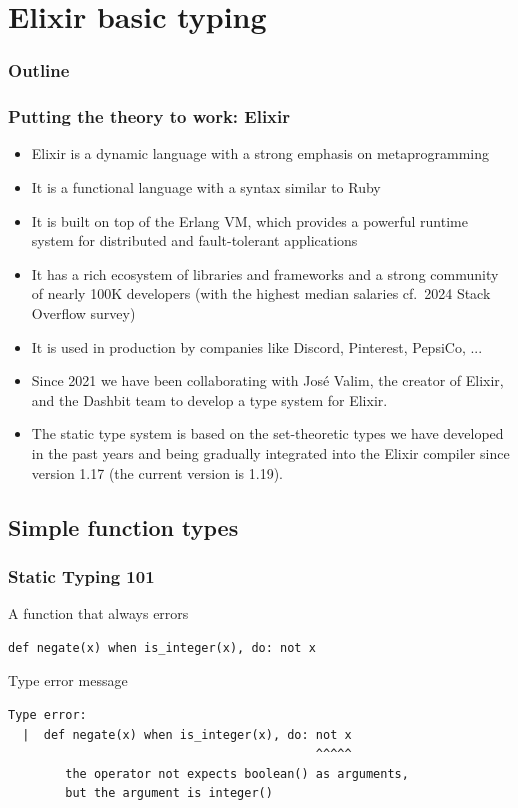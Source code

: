 
\section{Elixir basic typing}

\begin{frame}
\frametitle{Outline} 
\tableofcontents[currentsection]
\end{frame}

\begin{frame}
\frametitle{Putting the theory to work: Elixir}
\begin{itemize}
\item<1-> Elixir is a dynamic language with a strong emphasis on metaprogramming
\item<2-> It is a functional language with a syntax similar to Ruby
\item<3-> It is built on top of the Erlang VM, which provides a powerful runtime system for distributed and fault-tolerant applications
\item<4-> It has a rich ecosystem of libraries and frameworks and a strong community of nearly 100K developers (with the highest median salaries cf.\  2024 Stack Overflow survey)
\item<5-> It is used in production by companies like Discord, Pinterest, PepsiCo, ...
\item<6-> Since 2021 we have been collaborating with José Valim, the creator of Elixir, and the Dashbit team to develop a type system for Elixir.
\item<7-> The static type system is based on the set-theoretic types we have developed in the past years and being gradually integrated into the Elixir compiler since version 1.17 (the current version is 1.19).
\end{itemize}
\end{frame}


\subsection{Simple function types}


\begin{frame}[fragile]
\frametitle{Static Typing 101}
\begin{block}{A function that always errors}
\begin{verbatim}
def negate(x) when is_integer(x), do: not x
\end{verbatim}
\end{block}\pause
\begin{block}{Type error message}
\begin{verbatim}
Type error:
  |  def negate(x) when is_integer(x), do: not x
                                           ^^^^^
        the operator not expects boolean() as arguments,
        but the argument is integer()
\end{verbatim}
\end{block}
\end{frame}



